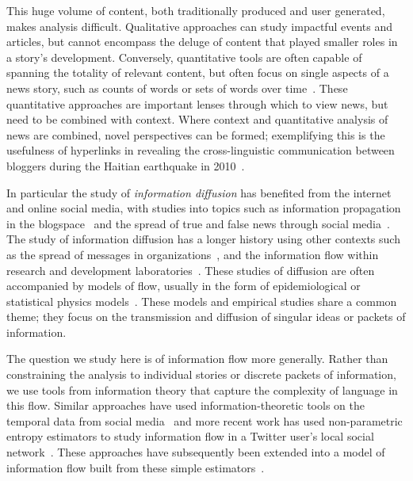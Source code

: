 This huge volume of content, both traditionally produced and user generated, makes analysis difficult. Qualitative approaches can study impactful events and articles, but cannot encompass the deluge of content that played smaller roles in a story's development. Conversely, quantitative tools are often capable of spanning the totality of relevant content, but often focus on single aspects of a news story, such as counts of words or sets of words over time~\cite{michelQuantitative2011,patriciaChanging2013, pechenick2015characterizing}. These quantitative approaches are important lenses through which to view news, but need to be combined with context. Where context and quantitative analysis of news are combined, novel perspectives can be formed; exemplifying this is the usefulness of hyperlinks in revealing the cross-linguistic communication between bloggers during the Haitian earthquake in 2010~\cite{haleNetIncreaseCrossLingual2012}. 


In particular the study of \emph{information diffusion} has benefited from the internet and online social media, with studies into topics such as information propagation in the blogspace~\cite{gruhlInformationDiffusionBlogspace2004} and the spread of true and false news through social media~\cite{vosoughiSpreadTrueFalse2018}. The study of information diffusion has a longer history using other contexts such as  the spread of messages in organizations~\cite{wuInformationFlowSocial2004}, and the information flow within research and development laboratories~\cite{allenInformationFlowResearch1969}. These studies of diffusion are often accompanied by models of flow, usually in the form of epidemiological or statistical physics models~\cite{castellanoStatisticalPhysicsSocial2009}. These models and empirical studies share a common theme; they focus on the transmission and diffusion of singular ideas or packets of information. 


The question we study here is of information flow more generally. Rather than constraining the analysis to individual stories or discrete packets of information, we use tools from information theory that capture the complexity of language in this flow. Similar approaches have used information-theoretic tools on the temporal data from social media~\cite{versteegInformationTransferSocial2012} and more recent work has used non-parametric entropy estimators to study information flow in a Twitter user's local social network~\cite{bagrowInformationFlowReveals2019}. These approaches have subsequently been extended into a model of information flow built from these simple estimators~\cite{bagrow_quoter_2018,pondComplexContagionFeatures2020}. 

